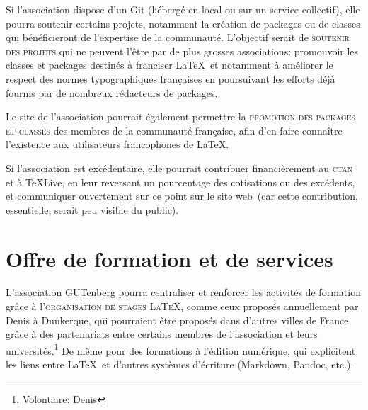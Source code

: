\documentclass{tufte-handout}
\newcommand{\ratio}[3][]{\marginpar{\footnotesize{\textcolor{teal}{Temps requis: #2 / Utilité: #3}\par\noindent \textcolor{teal}{#1}}}}
\begin{document}
Si l'association dispose d'un Git\ratio[Sur la base du bénévolat
uniquement]{+}{++} (hébergé en local ou sur un service collectif), elle pourra
soutenir certains projets, notamment la création de packages ou de classes qui
bénéficieront de l'expertise de la communauté. L'objectif serait de
\textsc{soutenir des projets} qui ne peuvent l'être par de plus grosses
associations: promouvoir les classes et packages destinés à franciser \LaTeX\,
et notamment à améliorer le respect des normes typographiques françaises en
poursuivant les efforts déjà fournis par de nombreux rédacteurs de packages.

Le site de l'association\ratio[Simple mise à jour du site]{+}{+++} pourrait
également permettre la \textsc{promotion des packages et classes} des membres de
la communauté française, afin d'en faire connaître l'existence aux utilisateurs
francophones de \LaTeX.

Si l'association est excédentaire\ratio[C'est encore un futur éloigné]{+}{+++},
elle pourrait contribuer financièrement au \textsc{ctan} et à \TeX Live, en leur
reversant un pourcentage des cotisations ou des excédents, et communiquer
ouvertement sur ce point sur le site web~(car cette contribution, essentielle,
serait peu visible du public).


\section{Offre de formation et de services}

L'association GUTenberg\ratio[Chronophage, mais utile et potentiellement
rémunéré]{+++}{+++} pourra centraliser et renforcer les activités de formation
grâce à l'\textsc{organisation de stages \LaTeX}, comme ceux proposés
annuellement par Denis  à Dunkerque, qui pourraient être proposés
dans d'autres villes de France grâce à des partenariats entre certains membres
de l'association et leurs universités.\footnote{Volontaire: Denis }
De même pour des formations à l'édition numérique, qui explicitent les liens
entre \LaTeX\ et d'autres systèmes d'écriture (Markdown, Pandoc, etc.).
\end{document}
